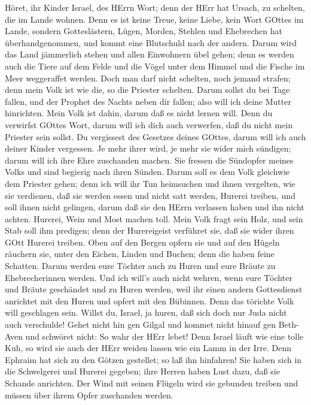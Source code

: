  Höret, ihr Kinder Israel, des HErrn Wort; denn der HErr hat
Ursach, zu schelten, die im Lande wohnen. Denn es ist keine Treue, keine
Liebe, kein Wort GOttes im Lande,  sondern Gotteslästern,
Lügen, Morden, Stehlen und Ehebrechen hat überhandgenommen, und kommt
eine Blutschuld nach der andern.  Darum wird das Land
jämmerlich stehen und allen Einwohnern übel gehen; denn es werden auch
die Tiere auf dem Felde und die Vögel unter dem Himmel und die Fische im
Meer weggeraffet werden.  Doch man darf nicht schelten, noch
jemand strafen; denn mein Volk ist wie die, so die Priester schelten.
 Darum sollst du bei Tage fallen, und der Prophet des Nachts
neben dir fallen; also will ich deine Mutter hinrichten. 
Mein Volk ist dahin, darum daß es nicht lernen will. Denn du verwirfst
GOttes Wort, darum will ich dich auch verwerfen, daß du nicht mein
Priester sein sollst. Du vergissest des Gesetzes deines GOttes, darum
will ich auch deiner Kinder vergessen.  Je mehr ihrer wird,
je mehr sie wider mich sündigen; darum will ich ihre Ehre zuschanden
machen.  Sie fressen die Sündopfer meines Volks und sind
begierig nach ihren Sünden.  Darum soll es dem Volk
gleichwie dem Priester gehen; denn ich will ihr Tun heimsuchen und ihnen
vergelten, wie sie verdienen,  daß sie werden essen und
nicht satt werden, Hurerei treiben, und soll ihnen nicht gelingen, darum
daß sie den HErrn verlassen haben und ihn nicht achten. 
Hurerei, Wein und Most machen toll.  Mein Volk fragt sein
Holz, und sein Stab soll ihm predigen; denn der Hurereigeist verführet
sie, daß sie wider ihren GOtt Hurerei treiben.  Oben auf
den Bergen opfern sie und auf den Hügeln räuchern sie, unter den Eichen,
Linden und Buchen; denn die haben feine Schatten. Darum werden eure
Töchter auch zu Huren und eure Bräute zu Ehebrecherinnen werden.
 Und ich will's auch nicht wehren, wenn eure Töchter und
Bräute geschändet und zu Huren werden, weil ihr einen andern
Gottesdienst anrichtet mit den Huren und opfert mit den Bübinnen. Denn
das törichte Volk will geschlagen sein.  Willst du, Israel,
ja huren, daß sich doch nur Juda nicht auch verschulde! Gehet nicht hin
gen Gilgal und kommet nicht hinauf gen Beth-Aven und schwöret nicht: So
wahr der HErr lebet!  Denn Israel läuft wie eine tolle Kuh,
so wird sie auch der HErr weiden lassen wie ein Lamm in der Irre.
 Denn Ephraim hat sich zu den Götzen gestellet; so laß ihn
hinfahren!  Sie haben sich in die Schwelgerei und Hurerei
gegeben; ihre Herren haben Lust dazu, daß sie Schande anrichten.
 Der Wind mit seinen Flügeln wird sie gebunden treiben und
müssen über ihrem Opfer zuschanden werden.

